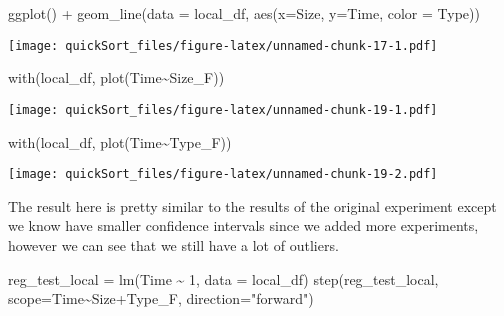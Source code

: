 \documentclass[
]{article}
\newenvironment{Shaded}{\begin{snugshade}}{\end{snugshade}}
\newcommand{\AttributeTok}[1]{\textcolor[rgb]{0.77,0.63,0.00}{#1}}
\newcommand{\DecValTok}[1]{\textcolor[rgb]{0.00,0.00,0.81}{#1}}
\newcommand{\FunctionTok}[1]{\textcolor[rgb]{0.00,0.00,0.00}{#1}}
\newcommand{\NormalTok}[1]{#1}
\newcommand{\OtherTok}[1]{\textcolor[rgb]{0.56,0.35,0.01}{#1}}
\newcommand{\SpecialCharTok}[1]{\textcolor[rgb]{0.00,0.00,0.00}{#1}}
\newcommand{\StringTok}[1]{\textcolor[rgb]{0.31,0.60,0.02}{#1}}
\begin{document}
\begin{Shaded}
\begin{Highlighting}[]
\FunctionTok{ggplot}\NormalTok{() }\SpecialCharTok{+}               
  \FunctionTok{geom\_line}\NormalTok{(}\AttributeTok{data =}\NormalTok{ local\_df, }\FunctionTok{aes}\NormalTok{(}\AttributeTok{x=}\NormalTok{Size, }\AttributeTok{y=}\NormalTok{Time, }\AttributeTok{color =}\NormalTok{ Type))}
\end{Highlighting}
\end{Shaded}

\texttt{[image: quickSort\_files/figure-latex/unnamed-chunk-17-1.pdf]}

\begin{Shaded}
\end{Shaded}

\begin{Shaded}
\begin{Highlighting}[]
\FunctionTok{with}\NormalTok{(local\_df, }\FunctionTok{plot}\NormalTok{(Time}\SpecialCharTok{\textasciitilde{}}\NormalTok{Size\_F))}
\end{Highlighting}
\end{Shaded}

\texttt{[image: quickSort\_files/figure-latex/unnamed-chunk-19-1.pdf]}

\begin{Shaded}
\begin{Highlighting}[]
\FunctionTok{with}\NormalTok{(local\_df, }\FunctionTok{plot}\NormalTok{(Time}\SpecialCharTok{\textasciitilde{}}\NormalTok{Type\_F))}
\end{Highlighting}
\end{Shaded}

\texttt{[image: quickSort\_files/figure-latex/unnamed-chunk-19-2.pdf]}

The result here is pretty similar to the results of the original
experiment except we know have smaller confidence intervals since we
added more experiments, however we can see that we still have a lot of
outliers.

\begin{Shaded}
\begin{Highlighting}[]
\NormalTok{reg\_test\_local }\OtherTok{=} \FunctionTok{lm}\NormalTok{(Time }\SpecialCharTok{\textasciitilde{}} \DecValTok{1}\NormalTok{, }\AttributeTok{data =}\NormalTok{ local\_df)}
\FunctionTok{step}\NormalTok{(reg\_test\_local, }\AttributeTok{scope=}\NormalTok{Time}\SpecialCharTok{\textasciitilde{}}\NormalTok{Size}\SpecialCharTok{+}\NormalTok{Type\_F, }\AttributeTok{direction=}\StringTok{"forward"}\NormalTok{)}
\end{Highlighting}
\end{Shaded}
\end{document}
